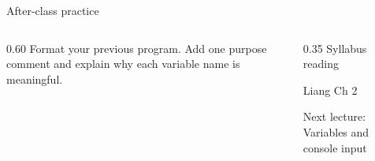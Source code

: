 \documentclass[10pt,aspectratio=169]{beamer}
\begin{document}
\begin{frame}[fragile,t]{After-class practice}
\begin{columns}[T,onlytextwidth]\begin{column}{0.60\textwidth}
Format your previous program. Add one purpose comment and explain why each variable name is meaningful.
\end{column}\begin{column}{0.35\textwidth}\small
Syllabus reading\par Liang Ch 2

Next lecture: Variables and console input
\end{column}\end{columns}
\end{frame}
\end{document}
